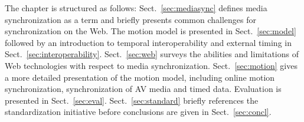 The chapter is structured as follows: Sect.~\ref{sec:mediasync} defines media
synchronization as a term and briefly presents common challenges for
synchronization on the Web. The motion model is presented in
Sect.~\ref{sec:model} followed by an introduction to temporal interoperability
and external timing in Sect.~\ref{sec:interoperability}. Sect.~\ref{sec:web} surveys the abilities and limitations of Web technologies with respect to media synchronization.
Sect.~\ref{sec:motion} gives a more detailed presentation of the motion model, including online motion synchronization, synchronization of AV media and timed data. Evaluation is presented in Sect.~\ref{sec:eval}.
Sect.~\ref{sec:standard} briefly references the standardization initiative before
conclusions are given in Sect.~\ref{sec:concl}.
